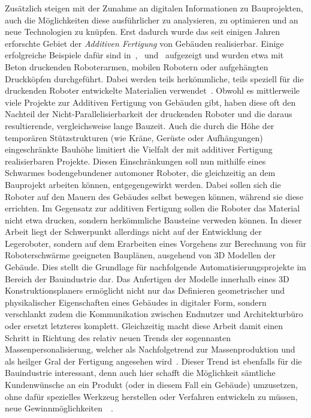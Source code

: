 Zusätzlich steigen mit der Zunahme an digitalen Informationen zu Bauprojekten, auch die Möglichkeiten diese ausführlicher zu analysieren, zu optimieren und an neue Technologien zu knüpfen.
Erst dadurch wurde das seit einigen Jahren erforschte Gebiet der \textit{Additiven Fertigung} von Gebäuden realisierbar.
Einige erfolgreiche Beispiele dafür sind in~\cite{AdditiveManufactoringDelgado},~\cite{AdditiveManufacturingUsingMobileRobots} und~\cite{Tankova2020} aufgezeigt und wurden etwa mit Beton druckenden Roboterarmen, mobilen Robotern oder aufgehängten Druckköpfen durchgeführt.
Dabei werden teils herkömmliche, teils speziell für die druckenden Roboter entwickelte Materialien verwendet~\cite{Tankova2020}.
Obwohl es mittlerweile viele Projekte zur Additiven Fertigung von Gebäuden gibt, haben diese oft den Nachteil der Nicht-Parallelisierbarkeit der druckenden Roboter und die daraus resultierende, vergleichsweise lange Bauzeit.
Auch die durch die Höhe der temporären Stützstrukturen (wie Kräne, Gerüste oder Aufhängungen) eingeschränkte Bauhöhe limitiert die Vielfalt der mit additiver Fertigung realisierbaren Projekte.
Diesen Einschränkungen soll nun mithilfe eines Schwarmes bodengebundener automoner Roboter, die gleichzeitig an dem Bauprojekt arbeiten können, entgegengewirkt werden.
Dabei sollen sich die Roboter auf den Mauern des Gebäudes selbst bewegen können, während sie diese errichten.
Im Gegensatz zur additiven Fertigung sollen die Roboter das Material nicht etwa drucken, sondern herkömmliche Bausteine verweden können.
In dieser Arbeit liegt der Schwerpunkt allerdings nicht auf der Entwicklung der Legeroboter, sondern auf dem Erarbeiten eines Vorgehens zur Berechnung von für Roboterschwärme geeigneten Bauplänen, ausgehend von 3D Modellen der Gebäude.
Dies stellt die Grundlage für nachfolgende Automatisierungsprojekte im Bereich der Bauindustrie dar.
Das Anfertigen der Modelle innerhalb eines 3D Konstruktionsplaners ermöglicht nicht nur das Definieren geometrischer und physikalischer Eigenschaften eines Gebäudes in digitaler Form, sondern verschlankt zudem die Kommunikation zwischen Endnutzer und Architekturbüro oder ersetzt letzteres komplett.
Gleichzeitig macht diese Arbeit damit einen Schritt in Richtung des relativ neuen Trends der sogennanten Massenpersonalisierung, welcher als Nachfolgetrend zur Massenproduktion und als \glqq{}heilger Gral\grqq{} der Fertigung angesehen wird~\cite{MassCustomHolyGrail}.
Dieser Trend ist ebenfalls für die Bauindustrie interessant, denn auch hier schafft die Möglichkeit sämtliche Kundenwünsche an ein Produkt (oder in diesem Fall ein Gebäude) umzusetzen, ohne dafür spezielles Werkzeug herstellen oder Verfahren entwickeln zu müssen, neue Gewinnmöglichkeiten~\cite{Jensen2018}~\cite{Jensen2015}.
